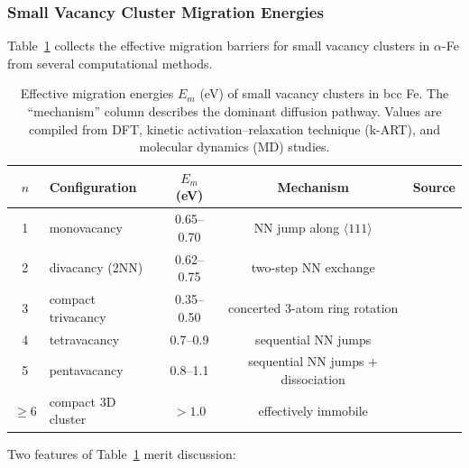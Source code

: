\documentclass[pdflatex,sn-basic]{sn-jnl} %
\begin{document}
\subsubsection{Small Vacancy Cluster Migration Energies}

Table~\ref{tab:Em_vac} collects the effective migration barriers for small
vacancy clusters in $\alpha$-Fe from several computational methods.

\begin{table}[htbp]
\centering
\caption{Effective migration energies $E_m$ (eV) of small vacancy clusters in
bcc Fe. The ``mechanism'' column describes the dominant diffusion pathway.
Values are compiled from DFT, kinetic activation--relaxation technique (k-ART),
and molecular dynamics (MD) studies.}
\label{tab:Em_vac}
\begin{tabular}{clccl}
\toprule
$n$ & Configuration & $E_m$ (eV) & Mechanism & Source \\
\midrule
1 & monovacancy  & 0.65--0.70 & NN jump along $\langle111\rangle$ &
    \cite{Fu2004,Domain2001,Seeger1998} \\
2 & divacancy (2NN)  & 0.62--0.75 & two-step NN exchange &
    \cite{Rahman2023,Fu2005_vac} \\
3 & compact trivacancy & 0.35--0.50 & concerted 3-atom ring rotation &
    \cite{Rahman2023,Schuler2015} \\
4 & tetravacancy & 0.7--0.9 & sequential NN jumps &
    \cite{Rahman2023} \\
5 & pentavacancy & 0.8--1.1 & sequential NN jumps + dissociation &
    \cite{Rahman2023} \\
$\geq 6$ & compact 3D cluster & $> 1.0$ & effectively immobile &
    \cite{Rahman2023} \\
\bottomrule
\end{tabular}
\end{table}

Two features of Table~\ref{tab:Em_vac} merit discussion:
\end{document}
